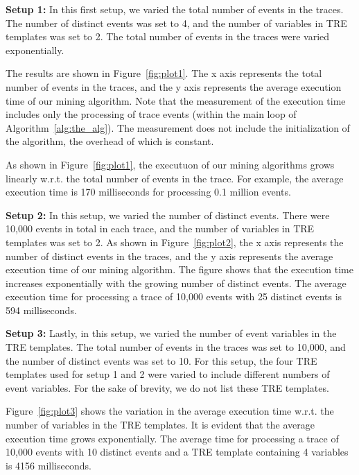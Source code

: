 \documentclass[]{sigplanconf}
\begin{document}
\vspace{3mm}

\noindent \textbf{Setup 1:}
In this first setup, we varied the total number of events in the traces. The number of distinct events was set to 4, and the number of variables in TRE templates was set to 2. The total number of events in the traces were varied exponentially.

The results are shown in Figure~\ref{fig:plot1}. The x axis represents the total number of events in the traces, and the y axis represents the average execution time of our mining algorithm. Note that the measurement of the execution time includes only the processing of trace events (within the main loop of Algorithm~\ref{alg:the_alg}). The measurement does not include the initialization of the algorithm, the overhead of which is constant.

As shown in Figure~\ref{fig:plot1}, the executuon of our mining algorithms grows linearly w.r.t. the total number of events in the trace. For example, the average execution time is 170 milliseconds for processing 0.1 million events.

\vspace{3mm}

\noindent \textbf{Setup 2:}
In this setup, we varied the number of distinct events. There were 10,000 events in total in each trace, and the number of variables in TRE templates was set to 2. As shown in Figure~\ref{fig:plot2}, the x axis represents the number of distinct events in the traces, and the y axis represents the average execution time of our mining algorithm. The figure shows that the execution time increases exponentially with the growing number of distinct events. The average execution time for processing a trace of 10,000 events with 25 distinct events is 594 milliseconds.

\vspace{3mm}

\noindent \textbf{Setup 3:}
Lastly, in this setup, we varied the number of event variables in the TRE templates. The total number of events in the traces was set to 10,000, and the number of distinct events was set to 10. For this setup, the four TRE templates used for setup 1 and 2 were varied to include different numbers of event variables. For the sake of brevity, we do not list these TRE templates.

Figure~\ref{fig:plot3} shows the variation in the average execution time w.r.t. the number of variables in the TRE templates.
It is evident that the average execution time grows exponentially. The average time for processing a trace of 10,000 events with 10 distinct events and a TRE template containing 4 variables is 4156 milliseconds.
\end{document}
